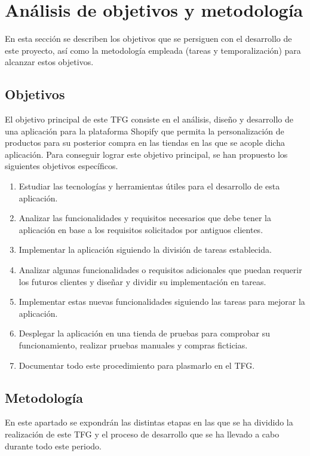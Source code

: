 \documentclass[12pt]{article}
\begin{document}
\clearpage
\section{Análisis de objetivos y metodología}
En esta sección se describen los objetivos que se persiguen con el desarrollo de este proyecto, así como la metodología empleada (tareas y temporalización) para alcanzar estos objetivos.

\subsection{Objetivos}

El objetivo principal de este TFG consiste en el análisis, diseño y desarrollo de una aplicación para la plataforma Shopify que permita
la personalización de productos para su posterior compra en las tiendas en las que se acople dicha aplicación. Para conseguir lograr este objetivo 
principal, se han propuesto los siguientes objetivos específicos.

\begin{enumerate}
    \item Estudiar las tecnologías y herramientas útiles para el desarrollo de esta aplicación. \label{item:objetivo1}
    \item Analizar las funcionalidades y requisitos necesarios que debe tener la aplicación en base a los requisitos solicitados por antiguos clientes. \label{item:objetivo2}
    \item Implementar la aplicación siguiendo la división de tareas establecida. \label{item:objetivo4}
    \item Analizar algunas funcionalidades o requisitos adicionales que puedan requerir los futuros clientes y diseñar y dividir su implementación en tareas. \label{item:objetivo5}
    \item Implementar estas nuevas funcionalidades siguiendo las tareas para mejorar la aplicación. \label{item:objetivo6}
    \item Desplegar la aplicación en una tienda de pruebas para comprobar su funcionamiento, realizar pruebas manuales y compras ficticias. \label{item:objetivo7}
    \item Documentar todo este procedimiento para plasmarlo en el TFG. \label{item:objetivo8}
\end{enumerate}

\subsection{Metodología}
En este apartado se expondrán las distintas etapas en las que se ha dividido la realización de este TFG y el proceso de desarrollo que se ha 
llevado a cabo durante todo este periodo.
\end{document}
